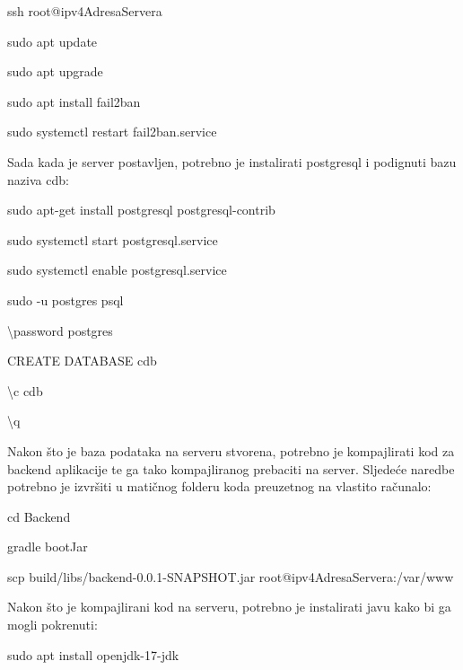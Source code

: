                 \begin{packed_item}
        			\item {ssh root@ipv4AdresaServera}
        			\item {sudo apt update}
        			\item {sudo apt upgrade}
        			\item {sudo apt install fail2ban}
        			\item {sudo systemctl restart fail2ban.service}
        		\end{packed_item}

                {Sada kada je server postavljen, potrebno je instalirati postgresql i podignuti bazu naziva cdb:}

                \begin{packed_item}
        			\item {sudo apt-get install postgresql postgresql-contrib}
        			\item {sudo systemctl start postgresql.service}
        			\item {sudo systemctl enable postgresql.service}
        			\item {sudo -u postgres psql}
        			\item {\textbackslash password postgres}
        			\item {CREATE DATABASE cdb}
        			\item {\textbackslash c cdb}
        			\item {\textbackslash q}
        		\end{packed_item}

                {Nakon što je baza podataka na serveru stvorena, potrebno je kompajlirati kod za backend aplikacije te ga tako kompajliranog prebaciti na server. Sljedeće naredbe potrebno je izvršiti u matičnog folderu koda preuzetnog na vlastito računalo:}

                \begin{packed_item}
        			\item {cd Backend}
        			\item {gradle bootJar}
        			\item {scp build/libs/backend-0.0.1-SNAPSHOT.jar root@ipv4AdresaServera:/var/www}
        		\end{packed_item}

                {Nakon što je kompajlirani kod na serveru, potrebno je instalirati javu kako bi ga mogli pokrenuti:}

                \begin{packed_item}
        			\item {sudo apt install openjdk-17-jdk}
        		\end{packed_item}

